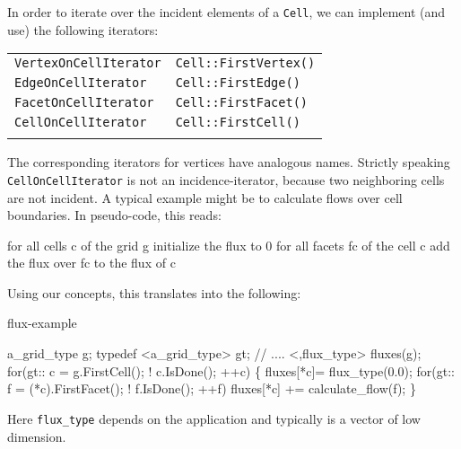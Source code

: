     In order to iterate 
    over the incident elements of a {\tt Cell}, 
    we can implement (and use) the following iterators:

    \begin{tabular}{ll} 
      \\
      {\tt VertexOnCellIterator} &  {\tt Cell::FirstVertex()}  \\ 
      {\tt EdgeOnCellIterator} &   {\tt Cell::FirstEdge()} \\ 
      {\tt FacetOnCellIterator} &  {\tt Cell::FirstFacet()}  \\
      {\tt CellOnCellIterator} &  {\tt Cell::FirstCell()} \\ 
      \\
    \end{tabular}

    The corresponding iterators for vertices have analogous names.
    Strictly speaking {\tt CellOnCellIterator}  is not an 
    incidence-iterator, because two
    neighboring cells are not incident.
    A typical example might be to calculate flows over cell boundaries.
    In pseudo-code, this reads:
    \begin{example}
     for all cells c of the grid g
        initialize the flux to 0
        for all facets fc  of the cell c
          add the flux over fc to the flux of c
    \end{example}
     
   Using our concepts, this translates into the following:
 
    \begin{Label}{flux-example}
 
  \begin{example}
 a_grid_type g;
 typedef <a_grid_type> gt;
 // ....
 <,flux\_type> fluxes(g);
 for(gt:: c = g.FirstCell(); ! c.IsDone(); ++c) \{
   fluxes[*c]= flux\_type(0.0);
   for(gt:: f = (*c).FirstFacet(); ! f.IsDone(); ++f)
     fluxes[*c] += calculate\_flow(f);
   \}
\end{example}
\end{Label}

Here {\tt flux\_type} depends on the application and typically is a vector
of low dimension.
